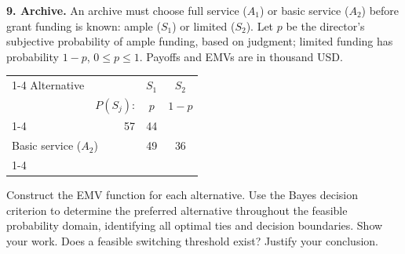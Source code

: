 \newpage

\noindent\begin{minipage}[t][0.48\textheight][t]{\textwidth}
\textbf{9. Archive.} An archive must choose full service ($A_1$) or basic service ($A_2$)
before grant funding is known: ample ($S_1$) or limited ($S_2$).
Let $p$ be the director's subjective probability of ample funding,
based on judgment; limited funding has probability $1-p$,
$0\leq p\leq1$. Payoffs and EMVs are in thousand USD.

\begin{center}
		\renewcommand{\arraystretch}{1.3}
		\small
		\begin{tabular}{lr@{\qquad}cc}
			\cmidrule{1-4}
			Alternative & & $S_1$ & $S_2$ \\
			& $P(S_j)$: & $p$ & $1-p$ \\
			\cmidrule{1-4}
			\multicolumn{2}{l}{Full service ($A_1$)} & 57 & 44 \\
			\multicolumn{2}{l}{Basic service ($A_2$)} & 49 & 36 \\
			\cmidrule{1-4}
		\end{tabular}
	\end{center}

Construct the EMV function for each alternative. Use the Bayes decision criterion to determine the preferred alternative throughout the feasible probability domain, identifying all optimal ties and decision boundaries. Show your work. Does a feasible switching threshold exist? Justify your conclusion.
\par\vfill
\end{minipage}\par

